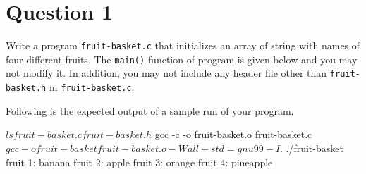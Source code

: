 
\section*{Question 1}

Write a program \texttt{fruit-basket.c} that initializes an array of string with names of four different fruits.
The \texttt{main()} function of program is given below and you may not modify it.
In addition, you may not include any header file other than \texttt{fruit-basket.h} in \texttt{fruit-basket.c}.

\lstset{language=c,tabsize=4}


Following is the expected output of a sample run of your program.

\begin{terminal}
$ ls
fruit-basket.c fruit-basket.h
$ gcc -c -o fruit-basket.o fruit-basket.c
$ gcc -o fruit-basket fruit-basket.o -Wall -std=gnu99 -I.
$ ./fruit-basket
fruit 1: banana
fruit 2: apple
fruit 3: orange
fruit 4: pineapple
\end{terminal}

